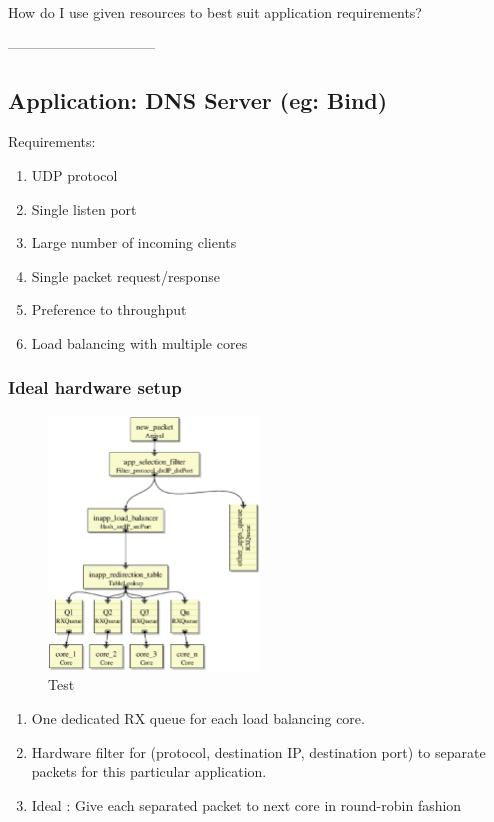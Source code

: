 How do I use given resources to best suit application requirements?

--------------------------------
\subsection{Application:  DNS Server (eg: Bind)}
Requirements:
\begin{enumerate}
    \item UDP protocol
    \item Single listen port
    \item Large number of incoming clients
    \item Single packet request/response
    \item Preference to throughput
    \item Load balancing with multiple cores
\end{enumerate}

\subsubsection{Ideal hardware setup}


\begin{figure}[t]
\centering
\includegraphics[width=0.5\textwidth]{figures/DNSServerIdeal.eps}
\caption{Test}
\end{figure}


\begin{enumerate}
    \item One dedicated RX queue for each load balancing core.
    \item Hardware filter for (protocol, destination IP, destination port) to separate
    packets for this particular application.
    \item Ideal : Give each separated packet to next core in round-robin fashion
\end{enumerate}

